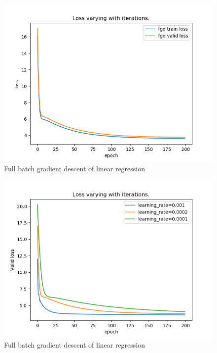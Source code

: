 \documentclass[journal, a4paper]{IEEEtran}
\begin{document}
\begin{figure}[!htb]
	\begin{center}
	\includegraphics[width=\columnwidth]{lr_fgd}
	\caption{Full batch gradient descent of linear regression}
	\label{fig:lr_fgd}
	\end{center}
\end{figure}
\begin{figure}[!htb]
	\begin{center}
	\includegraphics[width=\columnwidth]{lr_fgd_lr}
	\caption{Full batch gradient descent of linear regression}
	\label{fig:lr_fgd}
	\end{center}
\end{figure}
\end{document}
